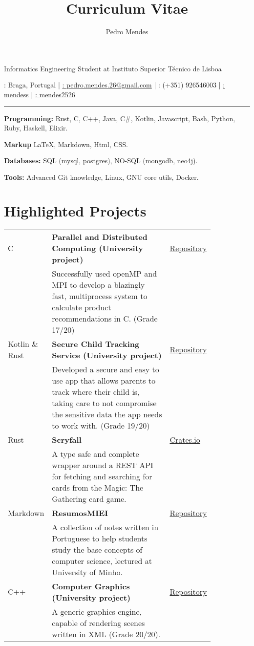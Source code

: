 \documentclass{article}
\makeatletter
\renewcommand{\maketitle}
{
        \begin{center}
            {\huge\bfseries\theauthor}

            \vspace{.25em}

            \Large{Informatics Engineering Student at Instituto Superior Técnico
            de Lisboa}

            \vspace{.25em}

            \large{\thetitle}

            \vspace{.25em}

            \faMapMarker: Braga, Portugal |
            \href{mailto:pedro.mendes.26@gmail.com}{\faEnvelope:
            pedro.mendes.26@gmail.com} |
            \faPhone: (+351) 926546003 |
            \href{https://github.com/mendess}{\faGithub: mendess} |
            \href{https://www.linkedin.com/in/mendes2526/}{\faLinkedinSquare: mendes2526}

        \end{center}
}
\makeatother
\begin{document}
\title{Curriculum Vitae}
\author{Pedro Mendes}

\maketitle

\hrule

\begin{multicols}{2}
    \textbf{Programming:} Rust, C, C++, Java, C\#, Kotlin, Javascript,
    Bash, Python, Ruby, Haskell, Elixir.

    \textbf{Markup} \LaTeX, Markdown, Html, CSS\@.

    \textbf{Databases:} SQL (mysql, postgres), NO-SQL (mongodb, neo4j).

    \textbf{Tools:} Advanced Git knowledge, Linux, GNU core utils, Docker.

\end{multicols}

\section{Highlighted Projects}

\begin{tabular}{p{0.11\linewidth}p{0.73\linewidth}l}
    C & \textbf{Parallel and Distributed Computing (University project)} &
    \href{https://github.com/mendess/CPD}{Repository}\\
    & Successfully used openMP and MPI to develop a blazingly fast,
    multiprocess system to calculate product recommendations in C. (Grade
    17/20) &\\

    Kotlin \& Rust & \textbf{Secure Child Tracking Service (University project)} &
    \href{https://github.com/mendess/SIRS}{Repository}\\
    & Developed a secure and easy to use app that allows parents to track
    where their child is, taking care to not compromise the sensitive data
    the app needs to work with. (Grade 19/20) &\\

    Rust & \textbf{Scryfall} &
    \href{https://crates.io/crates/scryfall}{Crates.io}\\
    & A type safe and complete wrapper around a REST API for fetching and
    searching for cards from the Magic: The Gathering\texttrademark{} card
    game. &\\

    Markdown & \textbf{ResumosMIEI} &
    \href{https://github.com/mendess/ResumosMIEI}{Repository}\\
    & A collection of notes written in Portuguese to help students study the
    base concepts of computer science, lectured at University of Minho. &\\

    C++ & \textbf{Computer Graphics (University project)} &
    \href{https://github.com/mendess/CG}{Repository}\\
    & A generic graphics engine, capable of rendering scenes written in XML
    (Grade 20/20). &\\

\end{tabular}
\end{document}
